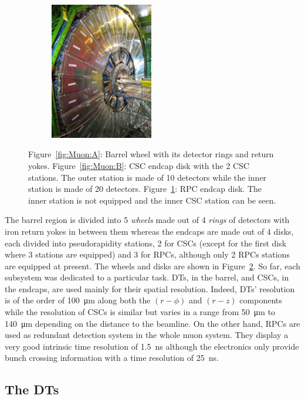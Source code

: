 \begin{figure}[H]
\begin{subfigure}{0.35\linewidth}
			\includegraphics[height = 6cm]{fig/chapt3/Disk_RPC.jpg}
			\caption{\label{fig:Muon:C}}
		\end{subfigure}
		\caption{\label{fig:Muon} Figure~\ref{fig:Muon:A}: Barrel wheel with its detector rings and return yokes. Figure~\ref{fig:Muon:B}: CSC endcap disk with the 2 CSC stations. The outer station is made of \SI{10}{\deg} detectors while the inner station is made of \SI{20}{\deg} detectors. Figure~\ref{fig:Muon:C}: RPC endcap disk. The inner station is not equipped and the inner CSC station can be seen.}
	\end{figure}
	
	The barrel region is divided into 5 \textit{wheels} made out of 4 \textit{rings} of detectors with iron return yokes in between them whereas the endcaps are made out of 4 disks, each divided into pseudorapidity stations, 2 for CSCs (except for the first disk where 3 stations are equipped) and 3 for RPCs, although only 2 RPCs stations are equipped at present. The wheels and disks are shown in Figure~\ref{fig:Muon}. So far, each subsystem was dedicated to a particular task. DTs, in the barrel, and CSCs, in the endcaps, are used mainly for their spatial resolution. Indeed, DTs' resolution is of the order of \SI{100}{\micro m} along both the $(r-\phi)$ and $(r-z)$ components while the resolution of CSCs is similar but varies in a range from \SI{50}{\micro m} to \SI{140}{\micro m} depending on the distance to the beamline. On the other hand, RPCs are used as redundant detection system in the whole muon system. They display a very good intrinsic time resolution of \SI{1.5}{ns} although the electronics only provide bunch crossing information with a time resolution of \SI{25}{ns}.
	
	\subsection{The \acl{DT}s}
	\label{chapt3:ssec:DTs}
	
